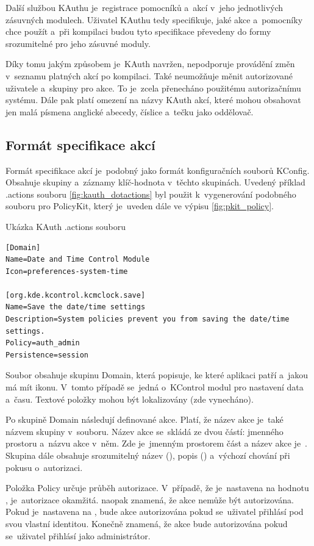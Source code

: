 Další službou KAuthu je~registrace pomocníků a~akcí v~jeho jednotlivých zásuvných modulech. Uživatel KAuthu tedy specifikuje, jaké akce a~pomocníky chce použít a~při kompilaci budou tyto specifikace převedeny do formy srozumitelné pro jeho zásuvné moduly.

Díky tomu jakým způsobem je~KAuth navržen, nepodporuje provádění změn v~seznamu platných akcí po kompilaci. Také neumožňuje měnit autorizované uživatele a~skupiny pro akce. To je~zcela přenecháno použitému autorizačnímu systému. Dále pak platí omezení na názvy KAuth akcí, které mohou obsahovat jen malá písmena anglické abecedy, číslice a~tečku jako oddělovač.

\subsection*{Formát specifikace akcí}
Formát specifikace akcí je~podobný jako formát konfiguračních souborů KConfig. Obsahuje skupiny a~záznamy klíč-hodnota v~těchto skupinách. Uvedený příklad .actions souboru \ref{fig:kauth_dotactions} byl použit k~vygenerování podobného souboru pro PolicyKit, který je~uveden dále ve výpisu \ref{fig:pkit_policy}.

\begin{mylisting}
\caption{Ukázka KAuth .actions souboru}
\label{fig:kauth_dotactions}
\begin{lstlisting}
[Domain]
Name=Date and Time Control Module
Icon=preferences-system-time

[org.kde.kcontrol.kcmclock.save]
Name=Save the date/time settings
Description=System policies prevent you from saving the date/time settings.
Policy=auth_admin
Persistence=session
\end{lstlisting}
\end{mylisting}

Soubor obsahuje skupinu Domain, která popisuje, ke které aplikaci patří a~jakou má mít ikonu. V~tomto případě se~jedná o~KControl modul pro nastavení data a~času. Textové položky mohou být lokalizovány (zde vynecháno).

Po skupině Domain následují definované akce. Platí, že název akce je~také názvem skupiny v~souboru. Název akce se~skládá ze dvou částí: jmenného prostoru a~názvu akce v~něm. Zde je~jmenným prostorem část  a název akce je~. Skupina dále obsahuje srozumitelný název (), popis () a~výchozí chování při pokusu o~autorizaci.

Položka Policy určuje průběh autorizace. V~případě, že je~nastavena na hodnotu , je~autorizace okamžitá.  naopak znamená, že akce nemůže být autorizována. Pokud je~nastavena na , bude akce autorizována pokud se~uživatel přihlásí pod svou vlastní identitou. Konečně  znamená, že akce bude autorizována pokud se~uživatel přihlásí jako administrátor.

